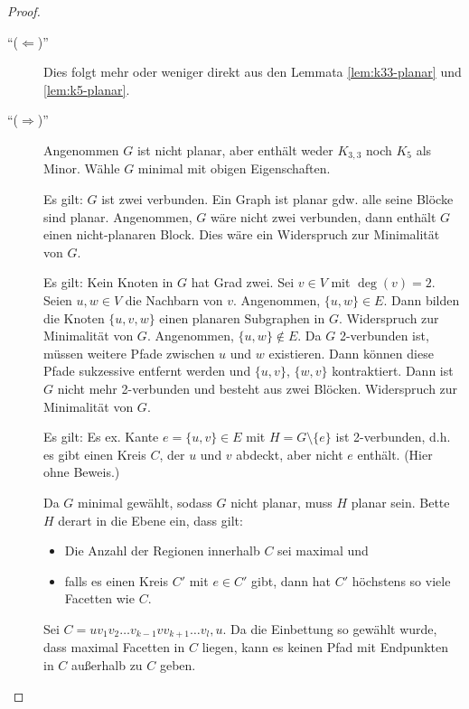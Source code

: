 \begin{proof}~\par
    \begin{description}
        \item[``($ \Leftarrow $)''] Dies folgt mehr oder weniger direkt aus den Lemmata \ref{lem:k33-planar} und \ref{lem:k5-planar}.
        \item[``($ \Rightarrow $)''] Angenommen $ G $ ist nicht planar, aber enthält weder $ K_{3,3} $ noch $ K_5 $ als Minor.
        Wähle $ G $ minimal mit obigen Eigenschaften.

        Es gilt: $ G $ ist zwei verbunden.
        Ein Graph ist planar gdw. alle seine Blöcke sind planar.
        Angenommen, $ G $ wäre nicht zwei verbunden, dann enthält $ G $ einen nicht-planaren Block.
        Dies wäre ein Widerspruch zur Minimalität von $ G $.

        Es gilt: Kein Knoten in $ G $ hat Grad zwei.
        Sei $ v \in V $ mit $ \deg(v) = 2 $.
        Seien $ u, w \in V $ die Nachbarn von $ v $.
        Angenommen, $ \{ u, w \} \in E $. Dann bilden die Knoten $ \{ u, v, w \} $ einen planaren Subgraphen in $ G $.
        Widerspruch zur Minimalität von $ G $.
        Angenommen, $ \{ u, w \} \notin E $.
        Da $ G $ 2-verbunden ist, müssen weitere Pfade zwischen $ u $ und $ w $ existieren.
        Dann können diese Pfade sukzessive entfernt werden und $ \{ u, v\} $, $ \{ w, v \} $ kontraktiert.
        Dann ist $ G $ nicht mehr 2-verbunden und besteht aus zwei Blöcken.
        Widerspruch zur Minimalität von $ G $.

        Es gilt: Es ex. Kante $ e = \{ u, v \} \in E $ mit $ H = G \setminus \{ e \} $ ist 2-verbunden, d.h. es gibt einen Kreis $ C $, der $ u $ und $ v $ abdeckt, aber nicht $ e $ enthält. (Hier ohne Beweis.)

        Da $ G $ minimal gewählt, sodass $ G $ nicht planar, muss $ H $ planar sein.
        Bette $ H $ derart in die Ebene ein, dass gilt:
        \begin{itemize}
            \item Die Anzahl der Regionen innerhalb $ C $ sei maximal und
            \item falls es einen Kreis $ C' $ mit $ e \in C' $ gibt, dann hat $ C' $ höchstens so viele Facetten wie $ C $.
        \end{itemize}

        Sei $ C = u v_1 v_2 \dots v_{k-1} v v_{k + 1} \dots v_l, u $.
        Da die Einbettung so gewählt wurde, dass maximal Facetten in $ C $ liegen, kann es keinen Pfad mit Endpunkten in $ C $ außerhalb zu $ C $ geben.


\end{description}
\end{proof}
